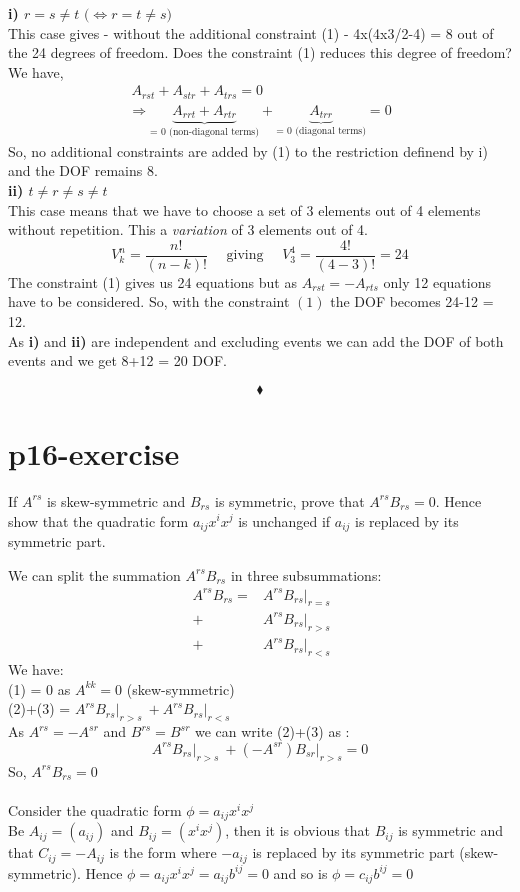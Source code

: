 \textbf{i) $r=s\neq t \text{ (}\Leftrightarrow r=t\neq s \text{)}$}\\
This case gives - without the additional constraint (1) -  4x(4x3/2-4) = 8 out of the 24 degrees of freedom.
Does the constraint (1) reduces this degree of freedom?\\
We have, 
\begin{align}
\ A_{rst} + A_{str}+A_{trs} =0\\
\Rightarrow \underbrace{A_{rrt} + A_{rtr}}_\text{= 0 (non-diagonal terms)} + \underbrace{A_{trr}}_\text{= 0 (diagonal terms)} =0
\end{align}
So, no additional constraints are added by (1) to the restriction definend by i) and the DOF remains 8.\\

\textbf{ii) $t \neq r\neq s\neq t$}\\
This case means that we have to choose a set of 3 elements out of 4 elements without repetition. This a \textit{variation} of 3 elements out of 4.
$$V^n_{k} = \frac{n!}{(n-k)!}\quad  \text{ giving } \quad V^4_{3} = \frac{4!}{(4-3)!} = 24 $$
The constraint (1) gives us 24 equations but as  $A_{rst} = -A_{rts}$ only 12 equations have to be considered. So, with the   constraint $(1)$  the DOF becomes 24-12 = 12.\\
As \textbf{i)} and \textbf{ii)} are independent and excluding events we can add the DOF of both events and we get 8+12 = 20 DOF.

$$\blacklozenge$$
\newpage

\section{p16-exercise}

\begin{tcolorbox}
If $A^{rs}$ is skew-symmetric and $B_{rs}$ is symmetric, prove that $A^{rs}B_{rs} = 0$. Hence show that the quadratic form $a_{ij}x^ix^j$ is unchanged if $a_{ij}$ is replaced by its symmetric part.
\end{tcolorbox}
We can split the summation $A^{rs}B_{rs}$ in three subsummations:
\begin{align}
\ A^{rs}B_{rs}  = &A^{rs}B_{rs} \vert_{r=s} \\
\ + &A^{rs}B_{rs}\vert_{r>s} \\
\ + &A^{rs}B_{rs}\vert_{r<s}
\end{align}
We have:\\
(1) = 0 as $A^{kk} = 0$ (skew-symmetric)\\
(2)+(3) = $A^{rs}B_{rs}\vert_{r>s} \ + A^{rs}B_{rs}\vert_{r<s}$\\
As $A^{rs} = -A^{sr}$ and $B^{rs} = B^{sr}$ we can write (2)+(3) as :
$$A^{rs}B_{rs}\vert_{r>s} \ + (-A^{sr})B_{sr}\vert_{r>s} = 0$$
So, $A^{rs}B_{rs} = 0$\\\\
Consider the quadratic form $\phi = a_{ij}x^ix^j$\\
Be $A_{ij} = (a_{ij})$ and $B_{ij} = (x^ix^j)$, then it is obvious that $B_{ij}$ is symmetric and that $C_{ij} = -A_{ij}$ is the form where $-a_{ij}$ is replaced by its symmetric part (skew-symmetric).
Hence $\phi = a_{ij}x^ix^j =a_{ij}b^{ij}= 0$ and so is $\phi = c_{ij}b^{ij}= 0$ 

